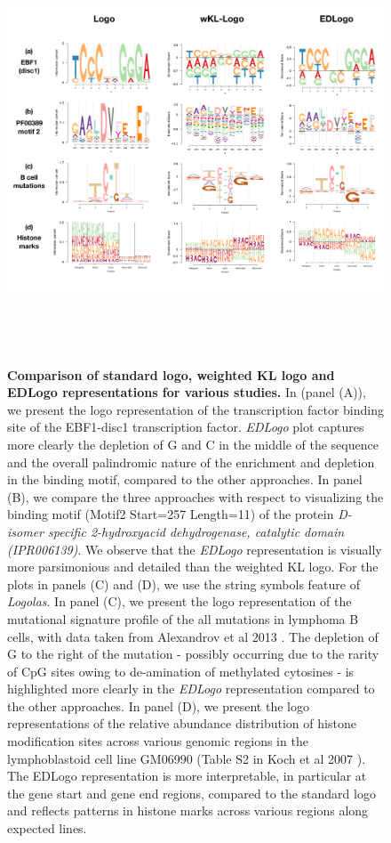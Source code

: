 \documentclass{bmcart}
\begin{document}
\begin{figure}[h!]
\centering
\includegraphics[height=5in,width=4.8in]{figures/Figure1.pdf}
 \caption{\textbf{Comparison of standard logo, weighted KL logo and EDLogo representations for various studies.} 
  In (panel (A)), we present the logo representation of the transcription factor binding site of the EBF1-disc1 transcription factor. \textit{EDLogo} plot captures more clearly the depletion of G and C in the middle of the sequence and the overall palindromic nature of the enrichment and depletion in the binding motif, compared to the other approaches. In panel (B), we compare the three approaches with respect to visualizing the binding motif (Motif2 Start=257 Length=11) of the protein \textit{D-isomer specific 2-hydroxyacid dehydrogenase, catalytic domain (IPR006139)}. We observe that the \textit{EDLogo} representation is visually more parsimonious and detailed than the weighted KL logo. For the plots in panels (C) and (D), we use the string symbols feature of \textit{Logolas}. In panel (C), we present the logo representation of the mutational signature profile of the all mutations in lymphoma B cells, with data taken from Alexandrov et al 2013 \cite{Alexandrov2013}. The depletion of G to the right of the mutation - possibly occurring due to the rarity of CpG sites owing to de-amination of methylated cytosines - is highlighted more clearly in the \textit{EDLogo} representation compared to the other approaches. In panel (D), we present the logo representations of the relative abundance distribution of histone modification sites across various genomic regions in the lymphoblastoid cell line GM06990 (Table S2 in Koch et al 2007 \cite{Koch2007}). The EDLogo representation is more interpretable, in particular at the gene start and gene end regions, compared to the standard logo and reflects patterns in histone marks across various regions along expected lines.}
\label{fig:fig0}
\end{figure}
\end{document}
